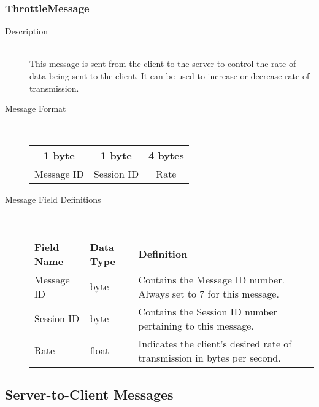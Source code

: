 \documentclass[12pt,letterpaper,titlepage]{article}
\begin{document}
\subsubsection{ThrottleMessage}
	\begin{description}
	\item[Description] \hfill \\
		This message is sent from the client to the server to control the rate of data being sent to the client. It can be used to increase or decrease rate of transmission.
	\item[Message Format] \hfill \\
	\begin{tabular}{ | c | c | c | }
		\hline
		1 byte & 1 byte & 4 bytes \\
		\hline
		Message ID & Session ID & Rate \\
		\hline
	\end{tabular}
	\item[Message Field Definitions] \hfill \\
	\begin{tabular}{ | p{3cm} | p{1.5cm} | p{8cm} | }
		\hline
		Field Name & Data Type & Definition \\
		\hline
		Message ID & byte & Contains the Message ID number. 
					\newline Always set to 7 for this message. \\
		\hline
		Session ID & byte & Contains the Session ID number pertaining to this message. \\
		\hline
        Rate & float & Indicates the client's desired rate of transmission in bytes per second. \\
        \hline
	\end{tabular}
	\end{description}

\subsection{Server-to-Client Messages}
\end{document}
